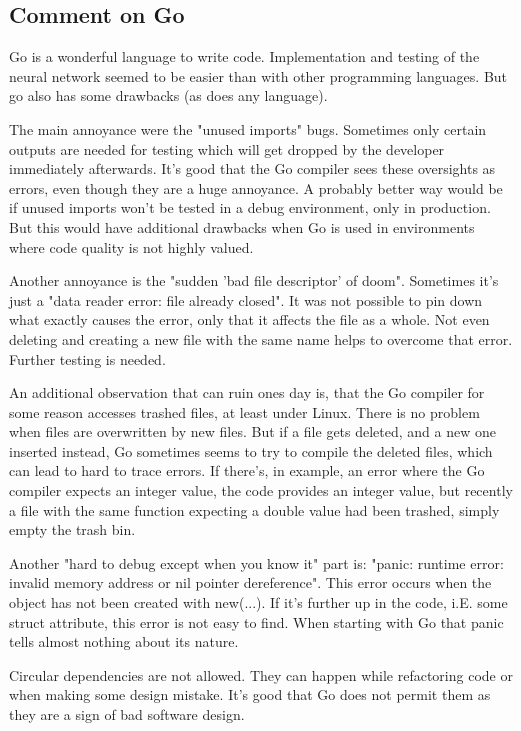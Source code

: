 \documentclass[11pt]{article}
\begin{document}
\subsection{Comment on Go}
Go is a wonderful language to write code. Implementation and testing of the neural network seemed to be easier than with other programming languages. But go also has some drawbacks (as does any language).

The main annoyance were the "unused imports" bugs. Sometimes only certain outputs are needed for testing which will get dropped by the developer immediately afterwards. It's good that the Go compiler sees these oversights as errors, even though they are a huge annoyance. A probably better way would be if unused imports won't be tested in a debug environment, only in production. But this would have additional drawbacks when Go is used in environments where code quality is not highly valued.

Another annoyance is the "sudden 'bad file descriptor' of doom". Sometimes it's just a "data reader error: file already closed". It was not possible to pin down what exactly causes the error, only that it affects the file as a whole. Not even deleting and creating a new file with the same name helps to overcome that error. Further testing is needed.

An additional observation that can ruin ones day is, that the Go compiler for some reason accesses trashed files, at least under Linux. There is no problem when files are overwritten by new files. But if a file gets deleted, and a new one inserted instead, Go sometimes seems to try to compile the deleted files, which can lead to hard to trace errors. If there's, in example, an error where the Go compiler expects an integer value, the code provides an integer value, but recently a file with the same function expecting a double value had been trashed, simply empty the trash bin.

Another "hard to debug except when you know it" part is: "panic: runtime error: invalid memory address or nil pointer dereference". This error occurs when the object has not been created with new(...). If it's further up in the code, i.E. some struct attribute, this error is not easy to find. When starting with Go that panic tells almost nothing about its nature.

Circular dependencies are not allowed. They can happen while refactoring code or when making some design mistake. It's good that Go does not permit them as they are a sign of bad software design.
\end{document}
